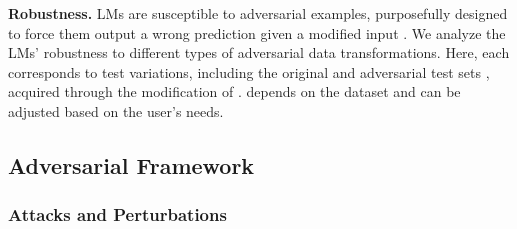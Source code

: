 \documentclass[11pt]{article}
\begin{document}
\vspace{0.1em}
\noindent\textbf{Robustness.} LMs are susceptible to adversarial examples, purposefully designed to force them output a wrong prediction given a modified input \cite{ebrahimi-etal-2018-hotflip, ijcai2018-585, jia-liang-2017-adversarial}. We analyze the LMs' robustness to different types of adversarial data transformations. Here, each  corresponds to  test variations, including the original  and  adversarial test sets , acquired through the modification of .  depends on the dataset and can be adjusted based on the user's needs. 


\subsection{Adversarial Framework} \label{sec:transformation_framework}
\subsubsection{Attacks and Perturbations}
\label{subsec:transformations}
\end{document}
